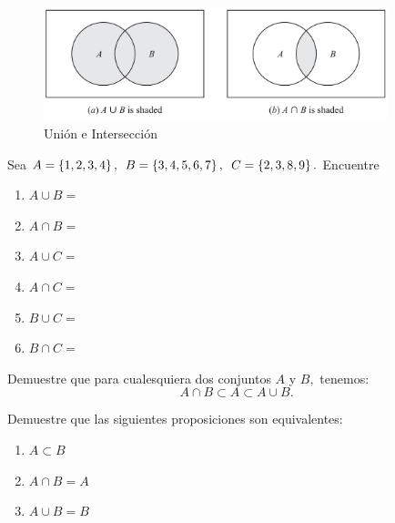 	\begin{figure}
		\centering
		\includegraphics[width=10cm,keepaspectratio=true]{./md/venn_union_interseccion.png}
		\caption{Unión e Intersección}
		\label{fig:0103}
	\end{figure}
	




	\begin{exmp}
		\label{lip:exmp:1.4.a}
		Sea $A=\left\{ 1,2,3,4 \right\},$ $B=\left\{ 3,4,5,6,7 \right\},$ $C=\left\{ 2,3,8,9 \right\}.$ Encuentre 
		\begin{enumerate}
			\item $A \cup B=$ 
			\item $A \cap B=$ 
			\item $A \cup C=$ 
			\item $A \cap C=$ 
			\item $B \cup C=$ 
			\item $B \cap C=$
		\end{enumerate}
		
	\end{exmp}
	



	\begin{exmp}
		\label{thm:1.3}
		Demuestre que para cualesquiera dos conjuntos $A$ y $B,$ tenemos:
		$$
		A \cap B \subset A \subset A \cup B.
		$$
	\end{exmp}
	



	\begin{exmp}
		\label{thm:1.4}
		Demuestre que las siguientes proposiciones son equivalentes:
		\begin{enumerate}
			\item $\displaystyle A \subset B$
			\item $\displaystyle A \cap B = A$
			\item $\displaystyle A \cup B = B$
		\end{enumerate}
		
	\end{exmp}
	



